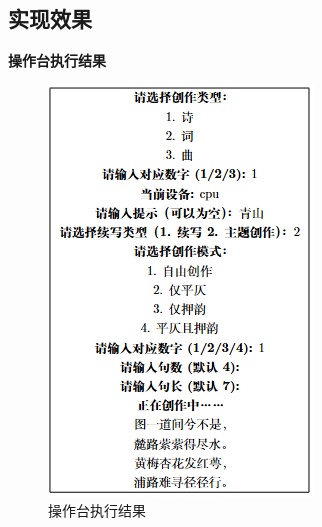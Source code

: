 \subsection{实现效果}
\textbf{操作台执行结果}
\begin{figure}[h]
    \centering
    \begin{minipage}[b]{0.44\textwidth}
        \centering
        \includegraphics[width=\textwidth]{img/writer/操作台执行结果.png}
        \caption{操作台执行结果}
        \label{fig:operation_result}
    \end{minipage}
    \hfill
    \begin{minipage}[b]{0.49\textwidth}
        \centering

\end{minipage}
\end{figure}
